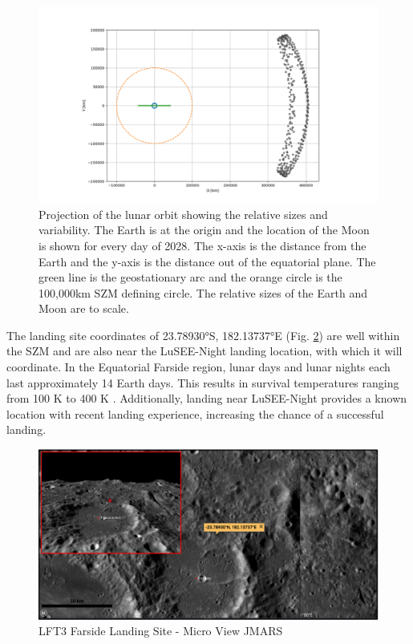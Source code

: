 \begin{figure}
	\centering
	\includegraphics[width=\linewidth]{figures/lunar_orbit_dist}
	\caption{Projection of the lunar orbit showing the relative sizes and variability. The Earth is at the origin and the location of the Moon is shown for every day of 2028. The x-axis is the distance from the Earth and the y-axis is the distance out of the equatorial plane.  The green line is the geostationary arc and the orange circle is the 100,000km SZM defining circle.  The relative sizes of the Earth and Moon are to scale.}
    \label{fig:orbit_banana}
\end{figure}

The landing site coordinates of 23.78930°S, 182.13737°E (Fig. \ref{fig:landing_site}) are well within the SZM and are also near the LuSEE-Night landing location, with which it will coordinate.  In the Equatorial Farside region, lunar days and lunar nights each last approximately 14 Earth days. This results in survival temperatures ranging from 100 K to 400 K \citep{2012JGRE..117.0H18V}.  Additionally, landing near LuSEE-Night provides a known location with recent landing experience, increasing the chance of a successful landing.

\begin{figure}
	\centering
	\includegraphics[width=\linewidth]{figures/Landing site overview.PNG}
	\caption{LFT3 Farside Landing Site - Micro View JMARS}
    \label{fig:landing_site}
\end{figure}

